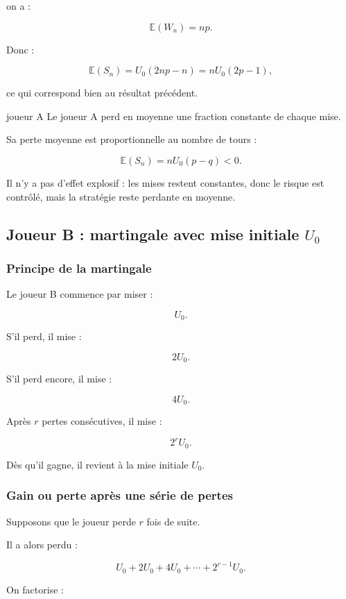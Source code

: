 \documentclass[11pt,a4paper]{article}
\begin{document}
on a :

\[
\mathbb{E}(W_n)=np.
\]

Donc :

\[
\mathbb{E}(S_n)
=
U_0(2np-n)
=
nU_0(2p-1),
\]

ce qui correspond bien au résultat précédent.

\begin{conclusionbox}{joueur A}
Le joueur A perd en moyenne une fraction constante de chaque mise.

Sa perte moyenne est proportionnelle au nombre de tours :

\[
\mathbb{E}(S_n)=nU_0(p-q)<0.
\]

Il n'y a pas d'effet explosif : les mises restent constantes, donc le risque est contrôlé, mais la stratégie reste perdante en moyenne.
\end{conclusionbox}

\subsection{Joueur B : martingale avec mise initiale \(U_0\)}

\subsubsection*{Principe de la martingale}

Le joueur B commence par miser :

\[
U_0.
\]

S'il perd, il mise :

\[
2U_0.
\]

S'il perd encore, il mise :

\[
4U_0.
\]

Après \(r\) pertes consécutives, il mise :

\[
2^rU_0.
\]

Dès qu'il gagne, il revient à la mise initiale \(U_0\).

\subsubsection*{Gain ou perte après une série de pertes}

Supposons que le joueur perde \(r\) fois de suite.

Il a alors perdu :

\[
U_0+2U_0+4U_0+\cdots+2^{r-1}U_0.
\]

On factorise :
\end{document}
